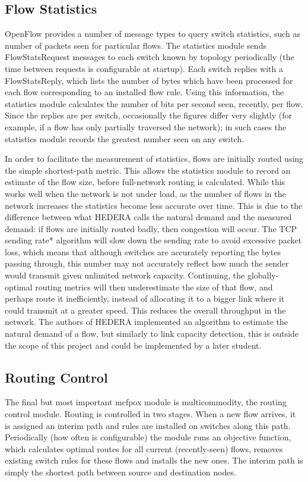 \subsection{Flow Statistics}
OpenFlow provides a number of message types to query switch statistics, such as number of packets seen for particular flows. The statistics module sends FlowStatsRequest messages to each switch known by topology periodically (the time between requests is configurable at startup). Each switch replies with a FlowStatsReply, which lists the number of bytes which have been processed for each flow corresponding to an installed flow rule. Using this information, the statistics module calculates the number of bits per second seen, recently, per flow. Since the replies are per switch, occasionally the figures differ very slightly (for example, if a flow has only partially traversed the network); in such cases the statistics module records the greatest number seen on any switch.

In order to facilitate the measurement of statistics, flows are initially routed using the simple shortest-path metric. This allows the statistics module to record an estimate of the flow size, before full-network routing is calculated. While this works well when the network is not under load, as the number of flows in the network increases the statistics become less accurate over time. This is due to the difference between what HEDERA calls the natural demand and the measured demand: if flows are initially routed badly, then congestion will occur. The TCP sending rate* algorithm will slow down the sending rate to avoid excessive packet loss, which means that although switches are accurately reporting the bytes passing through, this number may not accurately reflect how much the sender would transmit given unlimited network capacity. Continuing, the globally-optimal routing metrics will then underestimate the size of that flow, and perhaps route it inefficiently, instead of allocating it to a bigger link where it could transmit at a greater speed. This reduces the overall throughput in the network. The authors of HEDERA implemented an algorithm to estimate the natural demand of a flow, but similarly to link capacity detection, this is outside the scope of this project and could be implemented by a later student.

\subsection{Routing Control}
The final but most important mcfpox module is multicommodity, the routing control module. Routing is controlled in two stages. When a new flow arrives, it is assigned an interim path and rules are installed on switches along this path. Periodically (how often is configurable) the module runs an objective function, which calculates optimal routes for all current (recently-seen) flows, removes existing switch rules for these flows and installs the new ones. The interim path is simply the shortest path between source and destination nodes.

